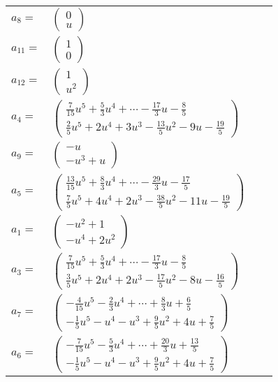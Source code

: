 \documentclass[1p]{elsarticle_modified}
\theoremstyle{definition}
\begin{document}
\begin{tabular}{m{7pt} m{180pt} m{7pt} m{180pt} }
\flushright $a_{8}=$&$\begin{pmatrix}0\\u\end{pmatrix}$ \\
\flushright $a_{11}=$&$\begin{pmatrix}1\\0\end{pmatrix}$ \\
\flushright $a_{12}=$&$\begin{pmatrix}1\\u^2\end{pmatrix}$ \\
\flushright $a_{4}=$&$\begin{pmatrix}\frac{7}{15} u^5+\frac{5}{3} u^4+\cdots-\frac{17}{3} u-\frac{8}{5}\\\frac{2}{5} u^5+2 u^4+3 u^3-\frac{13}{5} u^2-9 u-\frac{19}{5}\end{pmatrix}$ \\
\flushright $a_{9}=$&$\begin{pmatrix}- u\\- u^3+u\end{pmatrix}$ \\
\flushright $a_{5}=$&$\begin{pmatrix}\frac{13}{15} u^5+\frac{8}{3} u^4+\cdots-\frac{29}{3} u-\frac{17}{5}\\\frac{7}{5} u^5+4 u^4+2 u^3-\frac{38}{5} u^2-11 u-\frac{19}{5}\end{pmatrix}$ \\
\flushright $a_{1}=$&$\begin{pmatrix}- u^2+1\\- u^4+2 u^2\end{pmatrix}$ \\
\flushright $a_{3}=$&$\begin{pmatrix}\frac{7}{15} u^5+\frac{5}{3} u^4+\cdots-\frac{17}{3} u-\frac{8}{5}\\\frac{3}{5} u^5+2 u^4+2 u^3-\frac{17}{5} u^2-8 u-\frac{16}{5}\end{pmatrix}$ \\
\flushright $a_{7}=$&$\begin{pmatrix}-\frac{4}{15} u^5-\frac{2}{3} u^4+\cdots+\frac{8}{3} u+\frac{6}{5}\\-\frac{1}{5} u^5- u^4- u^3+\frac{9}{5} u^2+4 u+\frac{7}{5}\end{pmatrix}$ \\
\flushright $a_{6}=$&$\begin{pmatrix}-\frac{7}{15} u^5-\frac{5}{3} u^4+\cdots+\frac{20}{3} u+\frac{13}{5}\\-\frac{1}{5} u^5- u^4- u^3+\frac{9}{5} u^2+4 u+\frac{7}{5}\end{pmatrix}$ \\

\end{tabular}
\end{document}
